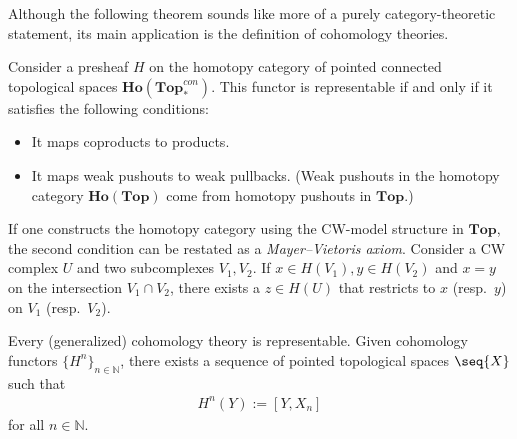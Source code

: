     Although the following theorem sounds like more of a purely category-theoretic statement, its main application is the definition of cohomology theories.
    \begin{theorem}\label{topology:brown}
        Consider a presheaf $H$ on the homotopy category of pointed connected topological spaces $\mathbf{Ho}(\mathbf{Top}^{con}_*)$. This functor is representable if and only if it satisfies the following conditions:
        \begin{itemize}
            \item It maps coproducts to products.
            \item It maps weak pushouts to weak pullbacks. (Weak pushouts in the homotopy category $\mathbf{Ho}(\mathbf{Top})$ come from homotopy pushouts in $\mathbf{Top}$.)
        \end{itemize}
    \end{theorem}
    \begin{remark}
        If one constructs the homotopy category using the CW-model structure in $\mathbf{Top}$, the second condition can be restated as a \textit{Mayer--Vietoris axiom}. Consider a CW complex $U$ and two subcomplexes $V_1,V_2$. If $x\in H(V_1),y\in H(V_2)$ and $x=y$ on the intersection $V_1\cap V_2$, there exists a $z\in H(U)$ that restricts to $x$ (resp.~$y$) on $V_1$ (resp.~$V_2$).
    \end{remark}
    \begin{result}[Cohomology]
        Every (generalized) cohomology theory is representable. Given cohomology functors $\{H^n\}_{n\in\mathbb{N}}$, there exists a sequence of pointed topological spaces $\seq{X}$ such that
        \begin{gather}
            H^n(Y) := [Y,X_n]
        \end{gather}
        for all $n\in\mathbb{N}$.
    \end{result}

